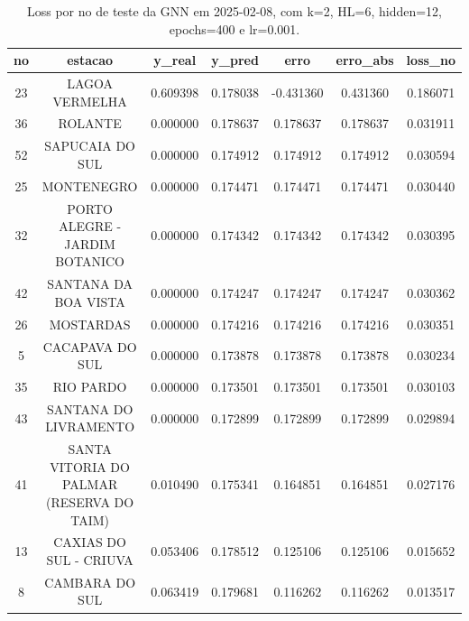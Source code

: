 \begin{table}[h]
\centering
\caption{Loss por no de teste da GNN em 2025-02-08, com k=2, HL=6, hidden=12, epochs=400 e lr=0.001.}
\label{tab:gnn_loss_k2_hl6_h12_e400_d20250208}
\begin{tabular}{ccccccc}
\toprule
no & estacao & y\_real & y\_pred & erro & erro\_abs & loss\_no \\
\midrule
23 & LAGOA VERMELHA & 0.609398 & 0.178038 & -0.431360 & 0.431360 & 0.186071 \\
36 & ROLANTE & 0.000000 & 0.178637 & 0.178637 & 0.178637 & 0.031911 \\
52 & SAPUCAIA DO SUL & 0.000000 & 0.174912 & 0.174912 & 0.174912 & 0.030594 \\
25 & MONTENEGRO & 0.000000 & 0.174471 & 0.174471 & 0.174471 & 0.030440 \\
32 & PORTO ALEGRE - JARDIM BOTANICO & 0.000000 & 0.174342 & 0.174342 & 0.174342 & 0.030395 \\
42 & SANTANA DA BOA VISTA & 0.000000 & 0.174247 & 0.174247 & 0.174247 & 0.030362 \\
26 & MOSTARDAS & 0.000000 & 0.174216 & 0.174216 & 0.174216 & 0.030351 \\
5 & CACAPAVA DO SUL & 0.000000 & 0.173878 & 0.173878 & 0.173878 & 0.030234 \\
35 & RIO PARDO & 0.000000 & 0.173501 & 0.173501 & 0.173501 & 0.030103 \\
43 & SANTANA DO LIVRAMENTO & 0.000000 & 0.172899 & 0.172899 & 0.172899 & 0.029894 \\
41 & SANTA VITORIA DO PALMAR (RESERVA DO TAIM) & 0.010490 & 0.175341 & 0.164851 & 0.164851 & 0.027176 \\
13 & CAXIAS DO SUL - CRIUVA & 0.053406 & 0.178512 & 0.125106 & 0.125106 & 0.015652 \\
8 & CAMBARA DO SUL & 0.063419 & 0.179681 & 0.116262 & 0.116262 & 0.013517 \\
\bottomrule
\end{tabular}
\end{table}
